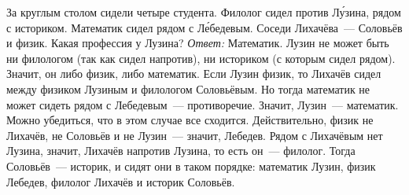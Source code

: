 \problem
За круглым столом сидели четыре студента.
Филолог сидел против Л\'{у}зина, рядом с историком.
Математик сидел рядом с Л\'{е}бедевым.
Соседи Лихачёва~--- Соловьёв и физик.
Какая профессия у Лузина?
\solution
\emph{Ответ:} Математик.
Лузин не может быть ни филологом (так как сидел напротив), ни историком
(с которым сидел рядом).
Значит, он либо физик, либо математик.
Если Лузин физик, то Лихачёв сидел между физиком Лузиным и филологом
Соловьёвым.
Но тогда математик не может сидеть рядом с Лебедевым~--- противоречие.
Значит, Лузин~--- математик.
Можно убедиться, что в этом случае все сходится.
Действительно, физик не Лихачёв, не Соловьёв и не Лузин~--- значит, Лебедев.
Рядом с Лихачёвым нет Лузина, значит, Лихачёв напротив Лузина, то есть он~---
филолог.
Тогда Соловьёв~--- историк, и сидят они в таком порядке:
математик Лузин, физик Лебедев, филолог Лихачёв и историк Соловьёв.
\endproblem
